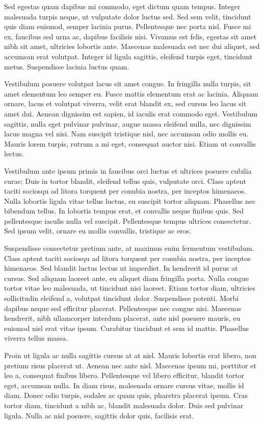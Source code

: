 \documentclass[%
 reprint,
 amsmath,amssymb,
 aps,
]{revtex4-2}
\begin{document}
Sed egestas quam dapibus mi commodo, eget dictum quam tempus. Integer malesuada turpis neque, ut vulputate dolor luctus sed. Sed sem velit, tincidunt quis diam euismod, semper lacinia purus. Pellentesque nec porta nisl. Fusce mi ex, faucibus sed urna ac, dapibus facilisis nisi. Vivamus est felis, egestas sit amet nibh sit amet, ultricies lobortis ante. Maecenas malesuada est nec dui aliquet, sed accumsan erat volutpat. Integer id ligula sagittis, eleifend turpis eget, tincidunt metus. Suspendisse lacinia luctus quam.

Vestibulum posuere volutpat lacus sit amet congue. In fringilla nulla turpis, sit amet elementum leo semper eu. Fusce mattis elementum erat ac lacinia. Aliquam ornare, lacus et volutpat viverra, velit erat blandit ex, sed cursus leo lacus sit amet dui. Aenean dignissim est sapien, id iaculis erat commodo eget. Vestibulum sagittis, nulla eget pulvinar pulvinar, augue massa eleifend nulla, nec dignissim lacus magna vel nisi. Nam suscipit tristique nisl, nec accumsan odio mollis eu. Mauris lorem turpis, rutrum a mi eget, consequat auctor nisi. Etiam ut convallis lectus.

Vestibulum ante ipsum primis in faucibus orci luctus et ultrices posuere cubilia curae; Duis in tortor blandit, eleifend tellus quis, vulputate orci. Class aptent taciti sociosqu ad litora torquent per conubia nostra, per inceptos himenaeos. Nulla lobortis ligula vitae tellus luctus, eu suscipit tortor aliquam. Phasellus nec bibendum tellus. In lobortis tempus erat, et convallis neque finibus quis. Sed pellentesque iaculis nulla vel suscipit. Pellentesque tempus ultrices consectetur. Sed ipsum velit, ornare eu mollis convallis, tristique ac eros.

Suspendisse consectetur pretium ante, at maximus enim fermentum vestibulum. Class aptent taciti sociosqu ad litora torquent per conubia nostra, per inceptos himenaeos. Sed blandit luctus lectus ut imperdiet. In hendrerit id purus at cursus. Sed aliquam laoreet ante, eu aliquet diam fringilla porta. Nulla congue tortor vitae leo malesuada, ut tincidunt nisi laoreet. Etiam tortor diam, ultricies sollicitudin eleifend a, volutpat tincidunt dolor. Suspendisse potenti. Morbi dapibus neque sed efficitur placerat. Pellentesque nec congue nisi. Maecenas hendrerit, nibh ullamcorper interdum placerat, ante nisl posuere mauris, eu euismod nisl erat vitae ipsum. Curabitur tincidunt et sem id mattis. Phasellus viverra tellus massa.

Proin ut ligula ac nulla sagittis cursus at at nisl. Mauris lobortis erat libero, non pretium risus placerat ut. Aenean nec ante nisl. Maecenas ipsum mi, porttitor et leo a, consequat finibus libero. Pellentesque vel libero efficitur, blandit tortor eget, accumsan nulla. In diam risus, malesuada ornare cursus vitae, mollis id diam. Donec odio turpis, sodales ac quam quis, pharetra placerat ipsum. Cras tortor diam, tincidunt a nibh ac, blandit malesuada dolor. Duis sed pulvinar ligula. Nulla ac nisl posuere, sagittis dolor quis, facilisis erat.
\end{document}

